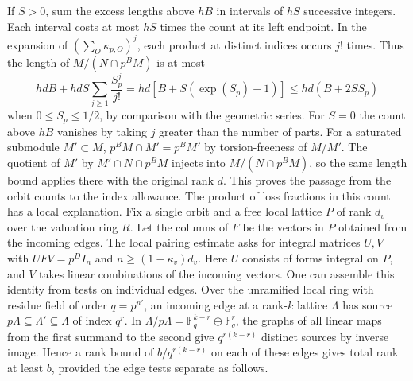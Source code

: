 \documentclass[11pt]{amsart}
\theoremstyle{definition}
\theoremstyle{remark}
\begin{document}
If $S>0$, sum the excess lengths above $hB$ in
intervals of $hS$ successive integers. Each interval costs at most
$hS$ times the count at its left endpoint. In the expansion of
$(\sum_O\kappa_{p,O})^j$, each product at distinct indices occurs
$j!$ times. Thus the length of $M/(N\cap p^BM)$ is at most
\[
 hdB+hdS\sum_{j\ge1}\frac{S_p^j}{j!}
     =hd[B+S(\exp(S_p)-1)]\le hd(B+2SS_p)
\]
when $0\le S_p\le1/2$, by comparison with the geometric series.
For $S=0$ the count above $hB$ vanishes by taking $j$ greater
than the number of parts. For a saturated submodule $M'\subset M$,
$p^BM\cap M'=p^BM'$ by torsion-freeness of $M/M'$. The quotient
of $M'$ by $M'\cap N\cap p^BM$ injects into $M/(N\cap p^BM)$,
so the same length bound applies there with the original rank $d$.
This proves the passage from the orbit counts to the index allowance.
The product of loss fractions in this count has a local explanation.
Fix a single orbit and a free local lattice $P$ of rank $d_v$ over
the valuation ring $R$. Let the columns of $F$ be the vectors in
$P$ obtained from the incoming edges. The local pairing estimate
asks for integral matrices $U,V$ with $UFV=p^D I_n$ and
$n\ge(1-\kappa_v)d_v$. Here $U$ consists of forms integral on
$P$, and $V$ takes linear combinations of the incoming vectors.
One can assemble this identity from tests on individual edges.
Over the unramified local ring with residue field of order $q=p^{n'}$,
an incoming edge at a rank-$k$ lattice $\Lambda$ has source
$p\Lambda\subseteq\Lambda'\subseteq\Lambda$ of index $q^r$.
In $\Lambda/p\Lambda=\mathbb F_q^{k-r}\oplus\mathbb F_q^r$,
the graphs of all linear maps from the first summand to the second
give $q^{r(k-r)}$ distinct sources by inverse image. Hence a rank
bound of $b/q^{r(k-r)}$ on each of these edges gives total rank
at least $b$, provided the edge tests separate as follows.
\end{document}
